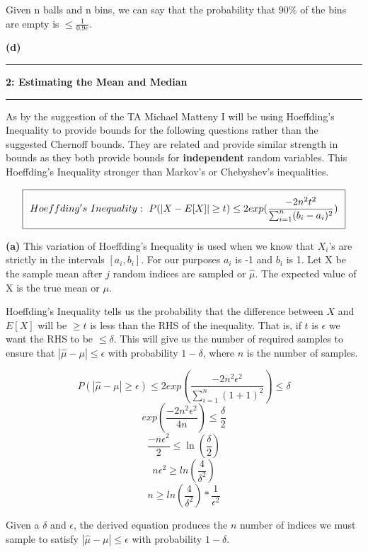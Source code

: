 \documentclass[11pt]{article}
\newcommand\question[2]{\vspace{.25in}\hrule\textbf{#1: #2}\vspace{.5em}\hrule\vspace{.10in}}
\renewcommand\part[1]{\vspace{.10in}\textbf{(#1)}}
\begin{document}
Given n balls and n bins, we can say that the probability that $90\%$ of the bins are empty is $\leq \frac{1}{0.9e}$.


\part{d}

\question{2}{Estimating the Mean and Median}

As by the suggestion of the TA Michael Matteny I will be using Hoeffding's Inequality to provide bounds for the following questions rather than the suggested Chernoff bounds. They are related and provide similar strength in bounds as they both provide bounds for \textbf{independent} random variables. This Hoeffding's Inequality stronger than Markov's or Chebyshev's inequalities.

\begin{equation}
\setlength\fboxsep{0.25cm}
\setlength\fboxrule{0.4pt}
\boxed{Hoeffding's \ Inequality: \ P(|X - E[X]| \geq t) \leq 2 exp(\frac{-2n^2t^2}{\sum_{i = 1}^n (b_i - a_i)^2})}
\end{equation}

\part{a} This variation of Hoeffding's Inequality is used when we know that $X_i$'s are strictly in the intervals $[a_i, b_i]$. For our purposes $a_i$ is -1 and $b_i$ is 1. Let X be the sample mean after $j$ random indices are sampled or $\hat\mu$. The expected value of X is the true mean or $\mu$. 

Hoeffding's Inequality tells us the probability that the difference between $X$ and $E[X]$ will be $\geq t$ is less than the RHS of the inequality. That is, if $t$ is $\epsilon$ we want the RHS to be $\leq \delta$. This will give us the number of required samples to ensure that $|\hat \mu - \mu| \leq \epsilon$ with probability $1 - \delta$, where $n$ is the number of samples.

$$P(|\hat \mu - \mu| \geq \epsilon) \leq 2 exp(\frac{-2n^2\epsilon^2}{\sum_{i = 1}^n (1 + 1)^2}) \leq \delta$$
$$exp(\frac{-2n^2\epsilon^2}{4n}) \leq \frac{\delta}{2}$$
$$\frac{-n\epsilon^2}{2} \leq \ln(\frac{\delta}{2})$$
$$n\epsilon^2 \geq ln(\frac{4}{\delta^2})$$
$$n \geq ln(\frac{4}{\delta^2}) * \frac{1}{\epsilon^2}$$

Given a $\delta$ and $\epsilon$, the derived equation produces the $n$ number of indices we must sample to satisfy $|\hat \mu - \mu| \leq \epsilon$ with probability $1 - \delta$.
\end{document}
